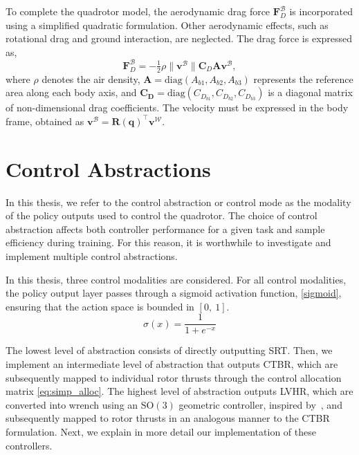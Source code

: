 To complete the quadrotor model, the aerodynamic drag force $\mathbf{F}^{\mathcal{B}}_D$ is incorporated using a simplified quadratic formulation.
Other aerodynamic effects, such as rotational drag and ground interaction, are neglected.
The drag force is expressed as,
\begin{equation}
    \mathbf{F}^{\mathcal{B}}_D = -\tfrac{1}{2}\rho \|\mathbf{v}^{\mathcal{B}}\| \mathbf{C}_D \mathbf{A} \mathbf{v}^{\mathcal{B}},
\end{equation}
where $\rho$ denotes the air density, $\mathbf{A} = \mathrm{diag}(A_{b1}, A_{b2}, A_{b3})$ represents the reference area along each body axis, and $\mathbf{C_D} = \mathrm{diag}(C_{D_{b1}}, C_{D_{b2}}, C_{D_{b3}})$  is a diagonal matrix of non-dimensional drag coefficients.
The velocity must be expressed in the body frame, obtained as $\mathbf{v}^{\mathcal{B}} = \mathbf{R}(\mathbf{q})^\top \mathbf{v}^{\mathcal{W}}$.


\section{Control Abstractions}\label{sec:ca}
In this thesis, we refer to the control abstraction or control mode as the modality of the policy outputs used to control the quadrotor.
The choice of control abstraction affects both controller performance for a given task and sample efficiency during training.
For this reason, it is worthwhile to investigate and implement multiple control abstractions.

In this thesis, three control modalities are considered.
For all control modalities, the policy output layer passes through a sigmoid activation function, \eqref{sigmoid}, ensuring that the action space is bounded in $[0,\ 1]$.
\begin{equation}\label{sigmoid}
    \sigma(x) = \frac{1}{1 + e^{-x}}
\end{equation}

The lowest level of abstraction consists of directly outputting \ac{SRT}.
Then, we implement an intermediate level of abstraction that outputs \ac{CTBR}, which are subsequently mapped to individual rotor thrusts through the control allocation matrix \eqref{eq:simp_alloc}.
The highest level of abstraction outputs \ac{LVHR}, which are converted into wrench using an $\mathrm{SO}(3)$ geometric controller, inspired by~\cite{lee_geometric_2010}, and subsequently mapped to rotor thrusts in an analogous manner to the \ac{CTBR} formulation.
Next, we explain in more detail our implementation of these controllers.

